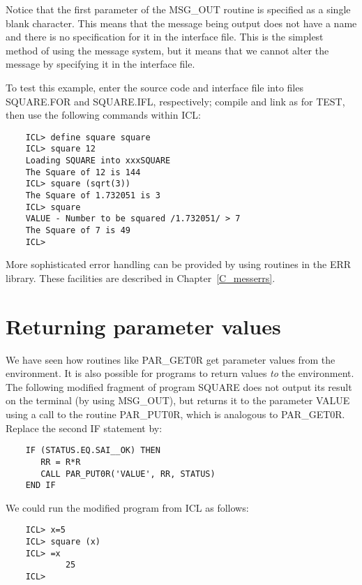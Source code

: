 Notice that the first parameter of the MSG\_OUT routine is specified as
a single blank character.
This means that the message being output does not have a name and there is
no specification for it in the interface file.
This is the simplest method of using the message system, but it means that
we cannot alter the message by specifying it in the interface file.

To test this example, enter the source code and interface file into files
SQUARE.FOR and SQUARE.IFL, respectively; compile and link as for TEST, then
use the following commands within ICL:

\begin{small}
\begin{verbatim}
    ICL> define square square
    ICL> square 12
    Loading SQUARE into xxxSQUARE
    The Square of 12 is 144
    ICL> square (sqrt(3))
    The Square of 1.732051 is 3
    ICL> square
    VALUE - Number to be squared /1.732051/ > 7
    The Square of 7 is 49
    ICL>
\end{verbatim}
\end{small}

More sophisticated error handling can be provided by using routines in the
ERR library.
These facilities are described in Chapter~\ref{C_messerrs}.

\section{Returning parameter values}

We have seen how routines like PAR\_GET0R get parameter values from the
environment.
It is also possible for programs to return values {\em to} the environment.
The following modified fragment of program SQUARE does not output its result
on the terminal (by using MSG\_OUT), but returns it to the parameter VALUE
using a call to the routine PAR\_PUT0R, which is analogous to PAR\_GET0R.
Replace the second IF statement by:

\begin{small}
\begin{verbatim}
    IF (STATUS.EQ.SAI__OK) THEN
       RR = R*R
       CALL PAR_PUT0R('VALUE', RR, STATUS)
    END IF
\end{verbatim}
\end{small}

We could run the modified program from ICL as follows:

\begin{small}
\begin{verbatim}
    ICL> x=5
    ICL> square (x)
    ICL> =x
            25
    ICL>
\end{verbatim}
\end{small}

